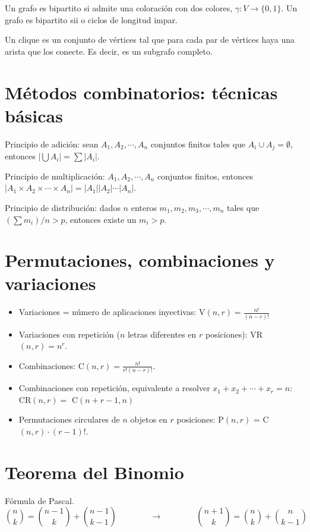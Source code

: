\documentclass[a4paper]{article}
\begin{document}
\hrulefill

Un grafo es bipartito si admite una coloración con dos colores, $\gamma: V\rightarrow\{0,1\}$. Un grafo es bipartito sii o ciclos de longitud impar.

\hrulefill

Un clique es un conjunto de vértices tal que para cada par de vértices haya una arista que los conecte. Es decir, es un subgrafo completo.

\section*{Métodos combinatorios: técnicas básicas}
Principio de adición: sean $A_1, A_2, \cdots, A_n$ conjuntos finitos tales que $A_i \cup A_j = \emptyset$, entonces $|\bigcup A_i| = \sum |A_i|$.

Principio de multiplicación:  $A_1, A_2, \cdots, A_n$ conjuntos finitos, entonces $|A_1 \times A_2 \times \cdots \times A_n| = |A_1||A_2|\cdots|A_n|$.

Principio de distribución: dados $n$ enteros $m_1,m_2,m_3,\cdots,m_n$ tales que $(\sum m_i) / n  > p$, entonces existe un $m_i > p$.

\section*{Permutaciones, combinaciones y variaciones}

\begin{itemize}
	\item Variaciones = número de aplicaciones inyectivas: V$(n,r) = \frac{n!}{(n-r)!}$
	\item Variaciones con repetición ($n$ letras diferentes en $r$ posiciones): VR$(n,r) = n^r$.
	\item Combinaciones: C$(n,r) = \frac{n!}{r!(n-r)!}$.
	\item Combinaciones con repetición, equivalente a resolver $x_1+x_2+\cdots+x_r=n$: CR$(n,r)=$ C$(n+r-1,n)$
	\item Permutaciones circulares de $n$ objetos en $r$ posiciones: P$(n,r)$ = C$(n,r)\cdot(r-1)!$.
\end{itemize}

\section*{Teorema del Binomio}
Fórmula de Pascal. 
$${n \choose k} = {n-1 \choose k} + {n-1 \choose k-1}  \qquad\qquad\rightarrow\qquad\qquad
{n+1 \choose k} = {n \choose k} + {n \choose k-1} $$
\end{document}
